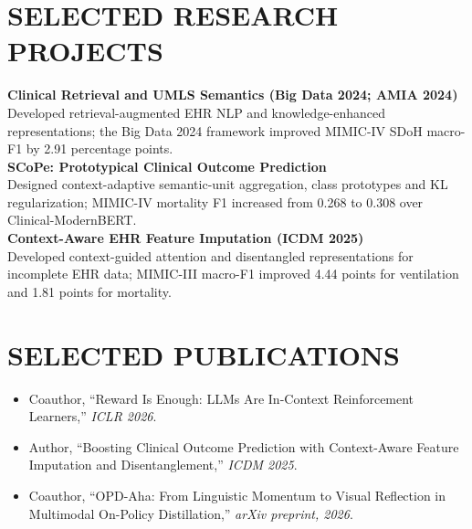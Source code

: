 \documentclass[10pt, letterpaper]{article}
\begin{document}
\section{SELECTED RESEARCH PROJECTS}
\textbf{Clinical Retrieval and UMLS Semantics (Big Data 2024; AMIA 2024)}\\[-1pt]
Developed retrieval-augmented EHR NLP and knowledge-enhanced representations; the Big Data 2024 framework improved MIMIC-IV SDoH macro-F1 by 2.91 percentage points.\\[3pt]
\textbf{SCoPe: Prototypical Clinical Outcome Prediction}\\[-1pt]
Designed context-adaptive semantic-unit aggregation, class prototypes and KL regularization; MIMIC-IV mortality F1 increased from 0.268 to 0.308 over Clinical-ModernBERT.\\[3pt]
\textbf{Context-Aware EHR Feature Imputation (ICDM 2025)}\\[-1pt]
Developed context-guided attention and disentangled representations for incomplete EHR data; MIMIC-III macro-F1 improved 4.44 points for ventilation and 1.81 points for mortality.\\[3pt]
\section{SELECTED PUBLICATIONS}
\begin{itemize}
\item Coauthor, ``Reward Is Enough: LLMs Are In-Context Reinforcement Learners,'' \textit{ICLR 2026}.
\item Author, ``Boosting Clinical Outcome Prediction with Context-Aware Feature Imputation and Disentanglement,'' \textit{ICDM 2025}.
\item Coauthor, ``OPD-Aha: From Linguistic Momentum to Visual Reflection in Multimodal On-Policy Distillation,'' \textit{arXiv preprint, 2026}.
\end{itemize}
\end{document}

